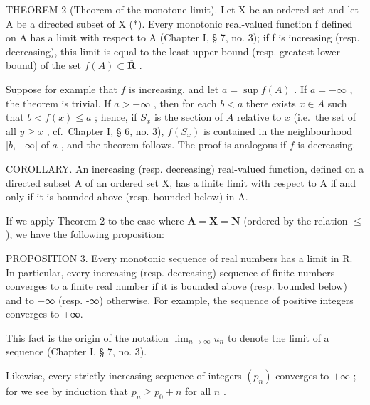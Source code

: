 THEOREM 2 (Theorem of the monotone limit). Let X be an ordered set and let A be a directed subset of X (*). Every monotonic real-valued function f defined on A has a limit with respect to A (Chapter I, § 7, no. 3); if f is increasing (resp. decreasing), this limit is equal to the least upper bound (resp. greatest lower bound) of the set \(f(A) \subset \overline{\mathbf{R}}\) .

Suppose for example that \(f\) is increasing, and let \(a = \sup f(A)\) . If \(a = -\infty\) , the theorem is trivial. If \(a > -\infty\) , then for each \(b < a\) there exists \(x \in A\) such that \(b < f(x) \leqslant a\) ; hence, if \(S_x\) is the section of \(A\) relative to \(x\) (i.e.~the set of all \(y \geqslant x\) , cf.~Chapter I, § 6, no. 3), \(f(S_x)\) is contained in the neighbourhood \(]b, +\infty]\) of \(a\) , and the theorem follows. The proof is analogous if \(f\) is decreasing.

COROLLARY. An increasing (resp. decreasing) real-valued function, defined on a directed subset A of an ordered set X, has a finite limit with respect to A if and only if it is bounded above (resp. bounded below) in A.

If we apply Theorem 2 to the case where \(\mathbf{A} = \mathbf{X} = \mathbf{N}\) (ordered by the relation \(\leqslant\) ), we have the following proposition:

PROPOSITION 3. Every monotonic sequence of real numbers has a limit in R. In particular, every increasing (resp. decreasing) sequence of finite numbers converges to a finite real number if it is bounded above (resp. bounded below) and to +∞ (resp. -∞) otherwise. For example, the sequence of positive integers converges to +∞.

This fact is the origin of the notation \(\lim_{n\to \infty}u_n\) to denote the limit of a sequence (Chapter I, § 7, no. 3).

Likewise, every strictly increasing sequence of integers \((p_n)\) converges to \(+\infty\) ; for we see by induction that \(p_n \geqslant p_0 + n\) for all \(n\) .

